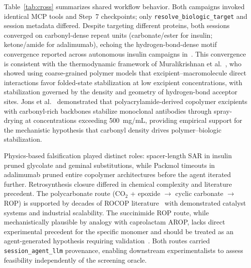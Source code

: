 \documentclass[twocolumn]{fairmeta}
\begin{document}
Table~\ref{tab:cross} summarizes shared workflow behavior.
Both campaigns invoked identical MCP tools and Step~7 checkpoints; only \texttt{resolve\_biologic\_target} and session metadata differed.
Despite targeting different proteins, both sessions converged on carbonyl-dense repeat units (carbonate/ester for insulin; ketone/amide for adalimumab), echoing the hydrogen-bond-dense motif convergence reported across autonomous insulin campaigns in~\cite{martins2026insulin}.
This convergence is consistent with the thermodynamic framework of Muralikrishnan et al.~\cite{muralikrishnan2025thermodynamic}, who showed using coarse-grained polymer models that excipient--macromolecule direct interactions favor folded-state stabilization at low excipient concentrations, with stabilization governed by the density and geometry of hydrogen-bond acceptor sites.
Jons et al.~\cite{jons2025ultrahigh} demonstrated that polyacrylamide-derived copolymer excipients with carbonyl-rich backbones stabilize monoclonal antibodies through spray-drying at concentrations exceeding 500~mg/mL, providing empirical support for the mechanistic hypothesis that carbonyl density drives polymer--biologic stabilization.

Physics-based falsification played distinct roles: spacer-length SAR in insulin pruned glycolate and geminal substitutions, while Packmol timeouts in adalimumab pruned entire copolymer architectures before the agent iterated further.
Retrosynthesis closure differed in chemical complexity and literature precedent.
The polycarbonate route (CO$_2$ + epoxide $\to$ cyclic carbonate $\to$ ROP) is supported by decades of ROCOP literature~\cite{paul2015rocop,williams2025coiii,zhang2018metalfree} with demonstrated catalyst systems and industrial scalability.
The succinimide ROP route, while mechanistically plausible by analogy with caprolactam AROP, lacks direct experimental precedent for the specific monomer and should be treated as an agent-generated hypothesis requiring validation~\cite{neuse2008polyaspartamides}.
Both routes carried \texttt{session\_agent\_llm} provenance, enabling downstream experimentalists to assess feasibility independently of the screening oracle.
\end{document}
